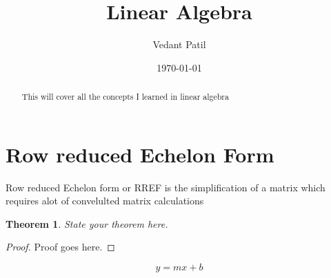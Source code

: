 \documentclass[12pt,a4paper]{article}
\title{Linear Algebra}
\author{Vedant Patil}
\date{\today}
\newtheorem{theorem}{Theorem}[section]
\begin{document}
\maketitle

\begin{abstract}
  This will cover all the concepts I learned in linear algebra 
\end{abstract}

\tableofcontents

\section{Row reduced Echelon Form}
Row reduced Echelon form or RREF is the simplification of a matrix which requires alot of convelulted matrix calculations 

\begin{theorem}
  State your theorem here.
\end{theorem}

\begin{proof}
  Proof goes here.
\end{proof}

\begin{equation}
  y = mx + b
\end{equation}



\end{document}
